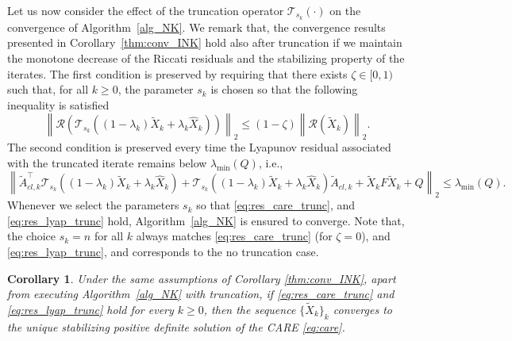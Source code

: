\documentclass[a4paper,10pt]{article}
\newcommand{\norm}[1]{\left\lVert#1\right\rVert}
\newtheorem{corollary}[definition]{Corollary}
\begin{document}
Let us now consider the effect of the truncation operator $\mathcal{T}_{s_k}(\cdot)$ on the convergence of Algorithm~\ref{alg_NK}. We remark that, the convergence results presented in Corollary~\ref{thm:conv_INK}  hold also after truncation if we maintain the monotone decrease of the Riccati residuals and the stabilizing property of the iterates. The first condition is preserved by requiring that there exists $\zeta\in[0,1)$ such that, for all $k\ge 0$, the parameter $s_k$ is chosen so that the following inequality is satisfied
\begin{equation}
\norm{ \mathcal{R}(\mathcal T_{s_k}((1-\lambda_k)\tilde X_k+\lambda_k\widehat X_k)) }_2 \le (1-\zeta) \norm{ \mathcal{R}(\tilde X_k) }_2.
\label{eq:res_care_trunc}
\end{equation}
The second condition is preserved every time the Lyapunov residual associated with the truncated iterate remains below $\lambda_{\min}(Q)$, i.e., 
\begin{equation}
\norm{\tilde{A}_{cl,k}^\top  \mathcal T_{s_k}((1-\lambda_k)\tilde X_k+\lambda_k\widehat X_k) + \mathcal T_{s_k}((1-\lambda_k)\tilde X_k+\lambda_k\widehat X_k) \tilde{A}_{cl,k} +   \tilde{X}_{k} F \tilde{X}_{k}+Q}_2 \le \lambda_{\min}(Q).
\label{eq:res_lyap_trunc}
\end{equation}
Whenever we select the parameters $s_k$ so that \eqref{eq:res_care_trunc}, and \eqref{eq:res_lyap_trunc} hold, Algorithm~\ref{alg_NK} is ensured to converge. Note that, the choice $s_k=n$ for all $k$ always matches \eqref{eq:res_care_trunc} (for $\zeta=0$), and \eqref{eq:res_lyap_trunc}, and corresponds to the no truncation case.

\begin{corollary}
Under the same assumptions of Corollary \ref{thm:conv_INK}, apart from executing Algorithm~\ref{alg_NK} with truncation,  if \eqref{eq:res_care_trunc} and \eqref{eq:res_lyap_trunc} hold for every $k\ge 0$, then the  sequence $\{\tilde X_k\}_k$ converges to the unique stabilizing positive definite solution of the CARE \eqref{eq:care}.
\end{corollary}
\end{document}
